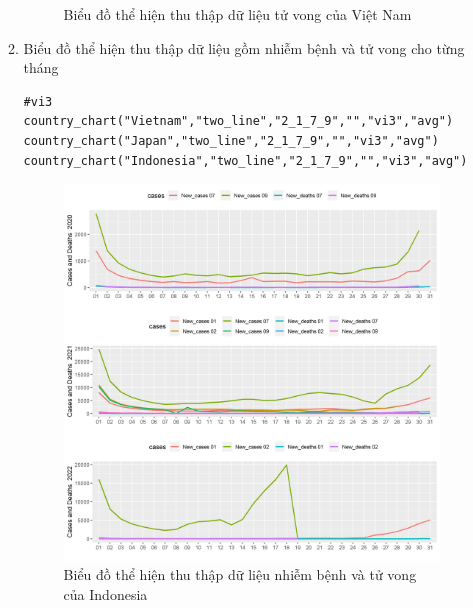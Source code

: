 \documentclass[a4paper]{article}
\theoremstyle{definition}
\begin{document}
\begin{enumerate}[i)]
\begin{enumerate}[1)]
\begin{figure}[htp]
		    \caption{Biểu đồ thể hiện thu thập dữ liệu tử vong của Việt Nam}
		    \label{fig:my_label}
		 \end{figure}
		 \newpage
    \item Biểu đồ thể hiện thu thập dữ liệu gồm nhiễm bệnh và tử vong cho từng tháng
    \begin{lstlisting}[frame=single]  
#vi3
country_chart("Vietnam","two_line","2_1_7_9","","vi3","avg")
country_chart("Japan","two_line","2_1_7_9","","vi3","avg")
country_chart("Indonesia","two_line","2_1_7_9","","vi3","avg")
		\end{lstlisting}	
		\begin{figure}[htp]
		    \centering
		    \includegraphics[scale = 0.7]{Images/VI/vi3 Indonesia .jpeg}
		    \caption{Biểu đồ thể hiện thu thập dữ liệu nhiễm bệnh và tử vong của Indonesia}
		    \label{fig:my_label}
		\end{figure}
		\begin{figure}[htp]
		    \centering

\end{figure}
\end{enumerate}
\end{enumerate}
\end{document}
